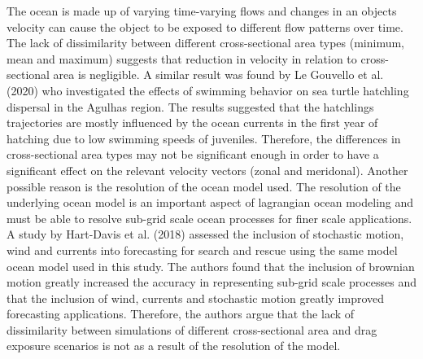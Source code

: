 \documentclass[
]{article}
\begin{document}
The ocean is made up of varying time-varying flows and changes in an
objects velocity can cause the object to be exposed to different flow
patterns over time. The lack of dissimilarity between different
cross-sectional area types (minimum, mean and maximum) suggests that
reduction in velocity in relation to cross-sectional area is negligible.
A similar result was found by Le Gouvello et al. (2020) who investigated
the effects of swimming behavior on sea turtle hatchling dispersal in
the Agulhas region. The results suggested that the hatchlings
trajectories are mostly influenced by the ocean currents in the first
year of hatching due to low swimming speeds of juveniles. Therefore, the
differences in cross-sectional area types may not be significant enough
in order to have a significant effect on the relevant velocity vectors
(zonal and meridonal). Another possible reason is the resolution of the
ocean model used. The resolution of the underlying ocean model is an
important aspect of lagrangian ocean modeling and must be able to
resolve sub-grid scale ocean processes for finer scale applications. A
study by Hart-Davis et al. (2018) assessed the inclusion of stochastic
motion, wind and currents into forecasting for search and rescue using
the same model ocean model used in this study. The authors found that
the inclusion of brownian motion greatly increased the accuracy in
representing sub-grid scale processes and that the inclusion of wind,
currents and stochastic motion greatly improved forecasting
applications. Therefore, the authors argue that the lack of
dissimilarity between simulations of different cross-sectional area and
drag exposure scenarios is not as a result of the resolution of the
model.
\end{document}
